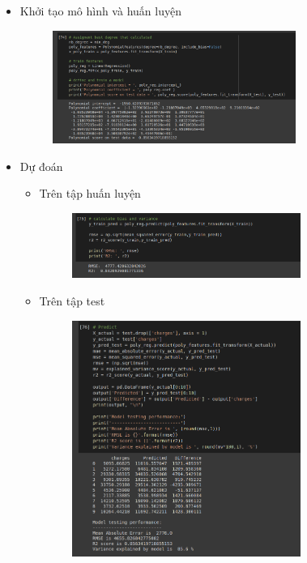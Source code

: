 \documentclass{article}
\begin{document}
\begin{itemize}
\begin{figure}[H]
		\end{figure}
		\item Khởi tạo mô hình và huấn luyện
		\begin{figure}[H]
			\centering
			\includegraphics[width=0.75\textwidth]{images/polynomial_reg/poly_init_fit.png}
		\end{figure}
		\item Dự đoán
		\begin{itemize}
			\item Trên tập huấn luyện
			\begin{figure}[H]
				\centering
				\includegraphics[width=0.75\textwidth]{images/polynomial_reg/poly_predict_train_set.png}
			\end{figure}
			\item Trên tập test
			\begin{figure}[H]
				\centering
				\includegraphics[width=0.75\textwidth]{images/polynomial_reg/poly_predict_test_evaluation.png}

\end{figure}
\end{itemize}
\end{itemize}
\end{document}
